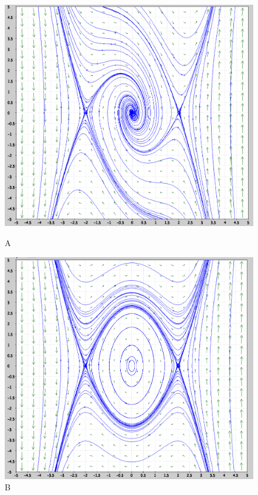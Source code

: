 \documentclass[11pt]{article}
\begin{document}
\begin{enumerate}
	\begin{figure}[h]
		  \includegraphics[width=\linewidth]{figA}
		  \caption{A}
	\endminipage\hfill
		  \includegraphics[width=\linewidth]{figB}
		  \caption{B}
	\endminipage\hfill

\end{figure}
\end{enumerate}
\end{document}
